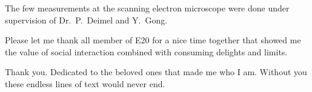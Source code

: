 	The few measurements at the scanning electron microscope were done under supervision of Dr.\ P.\ Deimel and Y.\ Gong.

	Please let me thank all member of E20 for a nice time together that showed me the value of social interaction combined with consuming delights and limits.

\begin{center}Thank you.
\newpage 
\thispagestyle{empty}
Dedicated to the beloved ones that made me who I am. Without you these endless lines of text would never end. 
\end{center}
\cleardoublepage{}